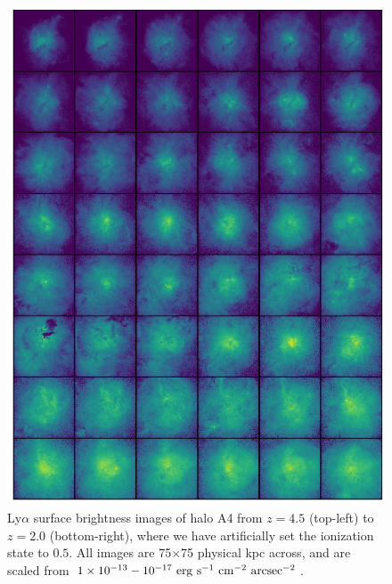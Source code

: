 \begin{figure}
    \centering
    \includegraphics[width=\textwidth,height=0.9\textheight,keepaspectratio]{figures/rogues_half_ionized.png}
    \caption{
        Ly$\alpha$ surface brightness images of halo A4 from $z=4.5$ (top-left) to $z=2.0$ (bottom-right), where we have artificially set the ionization state to $0.5$.
        All images are 75$\times$75 physical kpc across, and are scaled from $1\times10^{-13}-10^{-17}\ \rm{erg}\ \rm{s}^{-1}\ \rm{cm}^{-2}\ \rm{arcsec}^{-2}$.
    }
  \label{fig:rogues_half_ionized}
\end{figure}


